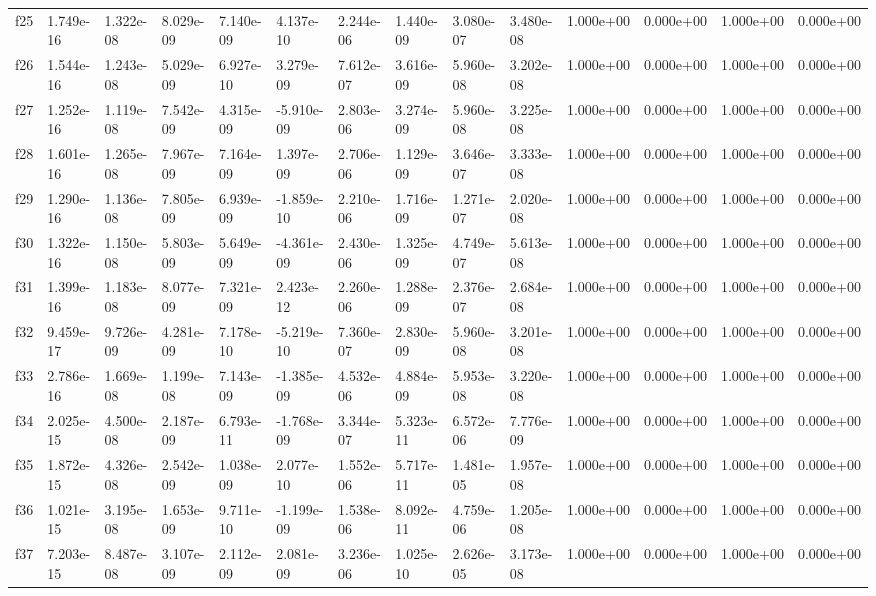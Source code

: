 \begin{table}
\begin{tabular}{llllllllllllll}
f25 & 1.749e-16 & 1.322e-08 & 8.029e-09 & 7.140e-09 & 4.137e-10 & 2.244e-06 & 1.440e-09 & 3.080e-07 & 3.480e-08 & 1.000e+00 & 0.000e+00 & 1.000e+00 & 0.000e+00 \\
f26 & 1.544e-16 & 1.243e-08 & 5.029e-09 & 6.927e-10 & 3.279e-09 & 7.612e-07 & 3.616e-09 & 5.960e-08 & 3.202e-08 & 1.000e+00 & 0.000e+00 & 1.000e+00 & 0.000e+00 \\
f27 & 1.252e-16 & 1.119e-08 & 7.542e-09 & 4.315e-09 & -5.910e-09 & 2.803e-06 & 3.274e-09 & 5.960e-08 & 3.225e-08 & 1.000e+00 & 0.000e+00 & 1.000e+00 & 0.000e+00 \\
f28 & 1.601e-16 & 1.265e-08 & 7.967e-09 & 7.164e-09 & 1.397e-09 & 2.706e-06 & 1.129e-09 & 3.646e-07 & 3.333e-08 & 1.000e+00 & 0.000e+00 & 1.000e+00 & 0.000e+00 \\
f29 & 1.290e-16 & 1.136e-08 & 7.805e-09 & 6.939e-09 & -1.859e-10 & 2.210e-06 & 1.716e-09 & 1.271e-07 & 2.020e-08 & 1.000e+00 & 0.000e+00 & 1.000e+00 & 0.000e+00 \\
f30 & 1.322e-16 & 1.150e-08 & 5.803e-09 & 5.649e-09 & -4.361e-09 & 2.430e-06 & 1.325e-09 & 4.749e-07 & 5.613e-08 & 1.000e+00 & 0.000e+00 & 1.000e+00 & 0.000e+00 \\
f31 & 1.399e-16 & 1.183e-08 & 8.077e-09 & 7.321e-09 & 2.423e-12 & 2.260e-06 & 1.288e-09 & 2.376e-07 & 2.684e-08 & 1.000e+00 & 0.000e+00 & 1.000e+00 & 0.000e+00 \\
f32 & 9.459e-17 & 9.726e-09 & 4.281e-09 & 7.178e-10 & -5.219e-10 & 7.360e-07 & 2.830e-09 & 5.960e-08 & 3.201e-08 & 1.000e+00 & 0.000e+00 & 1.000e+00 & 0.000e+00 \\
f33 & 2.786e-16 & 1.669e-08 & 1.199e-08 & 7.143e-09 & -1.385e-09 & 4.532e-06 & 4.884e-09 & 5.953e-08 & 3.220e-08 & 1.000e+00 & 0.000e+00 & 1.000e+00 & 0.000e+00 \\
f34 & 2.025e-15 & 4.500e-08 & 2.187e-09 & 6.793e-11 & -1.768e-09 & 3.344e-07 & 5.323e-11 & 6.572e-06 & 7.776e-09 & 1.000e+00 & 0.000e+00 & 1.000e+00 & 0.000e+00 \\
f35 & 1.872e-15 & 4.326e-08 & 2.542e-09 & 1.038e-09 & 2.077e-10 & 1.552e-06 & 5.717e-11 & 1.481e-05 & 1.957e-08 & 1.000e+00 & 0.000e+00 & 1.000e+00 & 0.000e+00 \\
f36 & 1.021e-15 & 3.195e-08 & 1.653e-09 & 9.711e-10 & -1.199e-09 & 1.538e-06 & 8.092e-11 & 4.759e-06 & 1.205e-08 & 1.000e+00 & 0.000e+00 & 1.000e+00 & 0.000e+00 \\
f37 & 7.203e-15 & 8.487e-08 & 3.107e-09 & 2.112e-09 & 2.081e-09 & 3.236e-06 & 1.025e-10 & 2.626e-05 & 3.173e-08 & 1.000e+00 & 0.000e+00 & 1.000e+00 & 0.000e+00 \\

\end{tabular}
\end{table}
